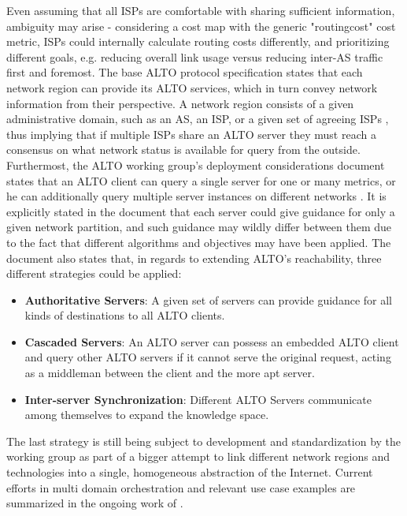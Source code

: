     Even assuming that all ISPs are comfortable with sharing sufficient information, ambiguity may arise - considering a cost map with the generic "routingcost" cost metric, ISPs could internally calculate routing costs differently, and prioritizing different goals, e.g. reducing overall link usage versus reducing inter-AS traffic first and foremost.
    The base ALTO protocol specification states that each network region can provide its ALTO services, which in turn convey network information from their perspective.
    A network region consists of a given administrative domain, such as an AS, an ISP, or a given set of agreeing ISPs \cite{alto-protocol}, thus implying that if multiple ISPs share an ALTO server they must reach a consensus on what network status is available for query from the outside.
    Furthermost, the ALTO working group's deployment considerations \cite{alto-deployment-considerations} document states that an ALTO client can query a single server for one or many metrics, or he can additionally query multiple server instances on different networks \cite{alto-deployment-considerations}.
    It is explicitly stated in the document that each server could give guidance for only a given network partition, and such guidance may wildly differ between them due to the fact that different algorithms and objectives may have been applied.
    The document also states that, in regards to extending ALTO's reachability, three different strategies could be applied:

\begin{itemize}
    \item \textbf{Authoritative Servers}: A given set of servers can provide guidance for all kinds of destinations to all ALTO clients.
    \item \textbf{Cascaded Servers}: An ALTO server can possess an embedded ALTO client and query other ALTO servers if it cannot serve the original request, acting as a middleman between the client and the more apt server.
    \item \textbf{Inter-server Synchronization}: Different ALTO Servers communicate among themselves to expand the knowledge space.
\end{itemize}

    The last strategy is still being subject to development and standardization by the working group as part of a bigger attempt to link different network regions and technologies into a single, homogeneous abstraction of the Internet.
    Current efforts in multi domain orchestration and relevant use case examples are summarized in the ongoing work of \cite{ALTO-multi-domain-use-cases(draft)}.


